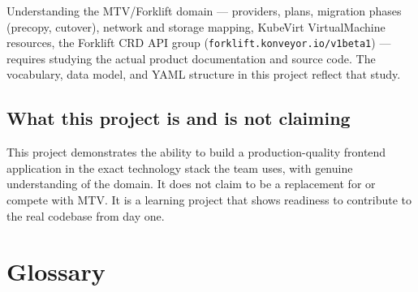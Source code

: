 \documentclass[12pt,a4paper]{article}
\begin{document}
Understanding the MTV/Forklift domain — providers, plans, migration phases (precopy, cutover), network and storage mapping, KubeVirt VirtualMachine resources, the Forklift CRD API group (\texttt{forklift.konveyor.io/v1beta1}) — requires studying the actual product documentation and source code. The vocabulary, data model, and YAML structure in this project reflect that study.

\subsection{What this project is and is not claiming}

This project demonstrates the ability to build a production-quality frontend application in the exact technology stack the team uses, with genuine understanding of the domain. It does not claim to be a replacement for or compete with MTV. It is a learning project that shows readiness to contribute to the real codebase from day one.

\section{Glossary}
\end{document}
